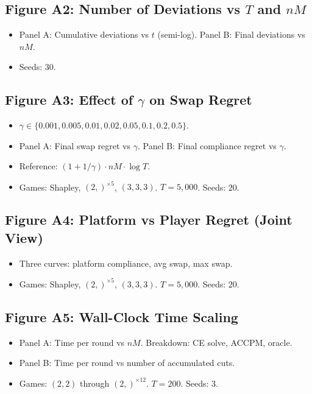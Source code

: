 \documentclass[11pt]{article}
\begin{document}
\subsection{Figure A2: Number of Deviations vs $T$ and $nM$}
\begin{itemize}[nosep]
    \item Panel A: Cumulative deviations vs $t$ (semi-log). Panel B: Final deviations vs $nM$.
    \item Seeds: 30.
\end{itemize}

\subsection{Figure A3: Effect of $\gamma$ on Swap Regret}
\begin{itemize}[nosep]
    \item $\gamma \in \{0.001, 0.005, 0.01, 0.02, 0.05, 0.1, 0.2, 0.5\}$.
    \item Panel A: Final swap regret vs $\gamma$. Panel B: Final compliance regret vs $\gamma$.
    \item Reference: $(1+1/\gamma) \cdot nM \cdot \log T$.
    \item Games: Shapley, $(2,)^{\times 5}$, $(3,3,3)$. $T = 5{,}000$. Seeds: 20.
\end{itemize}

\subsection{Figure A4: Platform vs Player Regret (Joint View)}
\begin{itemize}[nosep]
    \item Three curves: platform compliance, avg swap, max swap.
    \item Games: Shapley, $(2,)^{\times 5}$, $(3,3,3)$. $T = 5{,}000$. Seeds: 20.
\end{itemize}

\subsection{Figure A5: Wall-Clock Time Scaling}
\begin{itemize}[nosep]
    \item Panel A: Time per round vs $nM$. Breakdown: CE solve, ACCPM, oracle.
    \item Panel B: Time per round vs number of accumulated cuts.
    \item Games: $(2,2)$ through $(2,)^{\times 12}$. $T = 200$. Seeds: 3.
\end{itemize}
\end{document}
